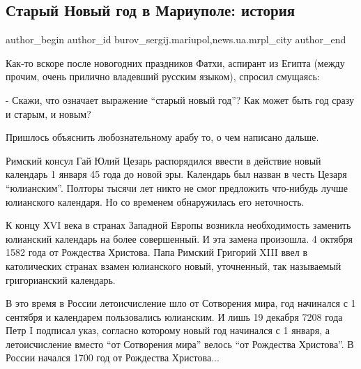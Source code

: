  
 
 
 
 
 
\subsection{Старый Новый год в Мариуполе: история}
\label{sec:13_01_2017.stz.news.ua.mrpl_city.1.staryj_novyj_god_v_mariupole}
 
\ifcmt
 author_begin
   author_id burov_sergij.mariupol,news.ua.mrpl_city
 author_end
\fi

Как-то вскоре после новогодних праздников Фатхи, аспирант из Египта (между
прочим, очень прилично владевший русским языком), спросил смущаясь:

- Скажи, что означает выражение \enquote{старый новый год}? Как может быть год сразу и
старым, и новым?

Пришлось объяснить любознательному арабу то, о чем написано дальше.

Римский консул Гай Юлий Цезарь  распорядился ввести в действие новый календарь
1 января  45 года до новой эры. Календарь был назван в честь  Цезаря
\enquote{юлианским}. Полторы тысячи лет никто не смог предложить что-нибудь лучше
юлианского календаря. Но со временем обнаружилась его неточность.

К концу ХVI века в странах Западной Европы возникла необходимость заменить
юлианский календарь на более совершенный. И эта замена произошла. 4 октября
1582 года от Рождества Христова. Папа Римский Григорий XIII ввел в католических
странах взамен юлианского новый, уточненный, так называемый  григорианский
календарь.

В это время в России летоисчисление шло от Сотворения мира, год начинался с 1
сентября и календарем пользовались юлианским. И лишь 19 декабря 7208 года Петр
I подписал указ, согласно которому новый год начинался с 1 января, а
летоисчисление вместо \enquote{от Сотворения мира} велось \enquote{от Рождества Христова}. В
России начался 1700 год от Рождества Христова...

